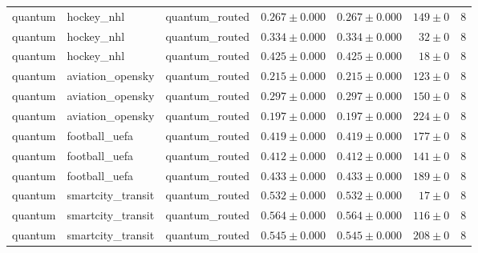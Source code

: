 \begin{table}[htbp]
\begin{tabular}{l l l r r r r}
quantum & hockey\_nhl & quantum\_routed & $0.267\pm0.000$ & $0.267\pm0.000$ & $149\pm0$ & 8 \\
quantum & hockey\_nhl & quantum\_routed & $0.334\pm0.000$ & $0.334\pm0.000$ & $32\pm0$ & 8 \\
quantum & hockey\_nhl & quantum\_routed & $0.425\pm0.000$ & $0.425\pm0.000$ & $18\pm0$ & 8 \\
quantum & aviation\_opensky & quantum\_routed & $0.215\pm0.000$ & $0.215\pm0.000$ & $123\pm0$ & 8 \\
quantum & aviation\_opensky & quantum\_routed & $0.297\pm0.000$ & $0.297\pm0.000$ & $150\pm0$ & 8 \\
quantum & aviation\_opensky & quantum\_routed & $0.197\pm0.000$ & $0.197\pm0.000$ & $224\pm0$ & 8 \\
quantum & football\_uefa & quantum\_routed & $0.419\pm0.000$ & $0.419\pm0.000$ & $177\pm0$ & 8 \\
quantum & football\_uefa & quantum\_routed & $0.412\pm0.000$ & $0.412\pm0.000$ & $141\pm0$ & 8 \\
quantum & football\_uefa & quantum\_routed & $0.433\pm0.000$ & $0.433\pm0.000$ & $189\pm0$ & 8 \\
quantum & smartcity\_transit & quantum\_routed & $0.532\pm0.000$ & $0.532\pm0.000$ & $17\pm0$ & 8 \\
quantum & smartcity\_transit & quantum\_routed & $0.564\pm0.000$ & $0.564\pm0.000$ & $116\pm0$ & 8 \\
quantum & smartcity\_transit & quantum\_routed & $0.545\pm0.000$ & $0.545\pm0.000$ & $208\pm0$ & 8 \\
\hline
\end{tabular}
\end{table}
